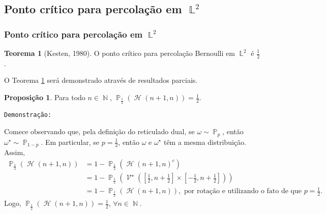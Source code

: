 \documentclass[9pt]{beamer}
\theoremstyle{definition} %
\newtheorem{mythm}{Teorema}
\newtheorem{mypro}{Proposição}
\DeclareMathOperator{\PX}{\mathbb{P}} %
\DeclareMathOperator{\NX}{\mathbb{N}} %
\DeclareMathOperator{\LX}{\mathbb{L}} %
\DeclareMathOperator{\HC}{\mathcal{H}} %
\DeclareMathOperator{\HL}{\mathcal{H}} %
\DeclareMathOperator{\VL}{\mathcal{V}} %
\begin{document}
	\subsection{Ponto crítico para percolação em $\LX^2$}
	\begin{frame}[t]
		\frametitle{Ponto crítico para percolação em $\LX^2$}
		\begin{mythm}[Kesten, 1980] \label{thm:kesten}
			O ponto crítico para percolação Bernoulli em $\LX^2$ é $\frac{1}{2}$.
		\end{mythm}\pause
		\vspace{-3pt}
		O Teorema \ref{thm:kesten} será demonstrado através de resultados parciais.
		\begin{mypro}\label{prop:meio}
			Para todo $n \in \NX$, $\PX_{\frac{1}{2}}(\HC(n + 1, n)) = \frac{1}{2}$.
		\end{mypro}\pause
		\vspace{-3pt}
		\texttt{Demonstração:}
		
		Comece observando que, pela definição do reticulado dual, se $\omega \sim \PX_p$, então $\omega^{\star} \sim \PX_{1 - p}$. Em particular, se $p = \frac{1}{2}$, então $\omega$ e $\omega^{\star}$ têm a mesma distribuição. Assim,
		\begin{align*}
		\PX_{\frac{1}{2}}(\HL(n+1, n)) &= 1 - \PX_{\frac{1}{2}}(\HL(n+1, n)^c) \\
		&= 1 - \PX_{\frac{1}{2}}\left(\VL^{\star}\left(\left[\frac{1}{2}, n+\frac{1}{2}\right]\times\left[-\frac{1}{2}, n+\frac{1}{2}\right]\right)\right) \\
		&= 1 - \PX_{\frac{1}{2}}(\HL(n+1, n)), \text{ por rotação e utilizando o fato de que } p = \frac{1}{2}.
		\end{align*}
		Logo, $\PX_{\frac{1}{2}}(\HC(n + 1, n)) = \frac{1}{2}$, $\forall n \in \NX$.
	\end{frame}
\end{document}
